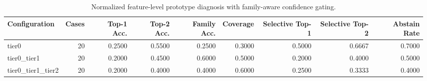 \begin{table}[t]
\centering
\caption{Normalized feature-level prototype diagnosis with family-aware confidence gating.}
\label{tab:dice_stressor_hierarchical_diagnosis}
\footnotesize
\begin{tabular}{lrrrrrrrr}
\toprule
Configuration & Cases & Top-1 Acc. & Top-2 Acc. & Family Acc. & Coverage & Selective Top-1 & Selective Top-2 & Abstain Rate \\
\midrule
tier0 & 20 & 0.2500 & 0.5500 & 0.2500 & 0.3000 & 0.5000 & 0.6667 & 0.7000 \\
tier0_tier1 & 20 & 0.2000 & 0.4500 & 0.6000 & 0.5000 & 0.2000 & 0.4000 & 0.5000 \\
tier0_tier1_tier2 & 20 & 0.2000 & 0.4000 & 0.4000 & 0.6000 & 0.2500 & 0.3333 & 0.4000 \\
\bottomrule
\end{tabular}

\end{table}

